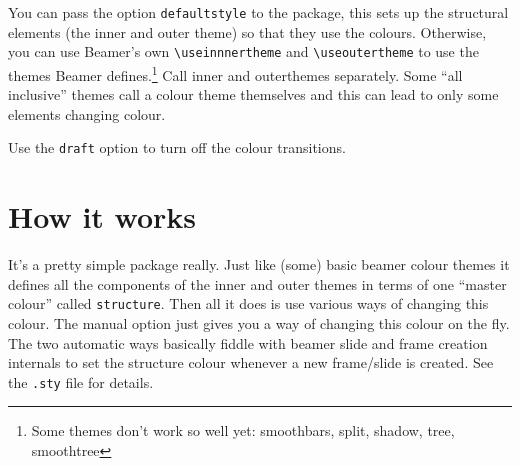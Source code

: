 \documentclass{scrartcl}
\begin{document}
You can pass the option \lstinline+defaultstyle+ to the package, this sets up the structural elements (the inner and outer theme) so that they use the colours.
Otherwise, you can use Beamer's own \lstinline+\useinnnertheme+ and \lstinline+\useoutertheme+ to use the themes Beamer defines.\footnote{%
  Some themes don't work so well yet: smoothbars, split, shadow, tree, smoothtree}
Call inner and outerthemes separately.
Some ``all inclusive'' themes call a colour theme themselves and this can lead to only some elements changing colour.

Use the \lstinline+draft+ option to turn off the colour transitions.

\section{How it works}

It's a pretty simple package really.
Just like (some) basic beamer colour themes it defines all the components of the inner and outer themes 
  in terms of one ``master colour'' called \lstinline+structure+.
Then all it does is use various ways of changing this colour.
The manual option just gives you a way of changing this colour on the fly.
The two automatic ways basically fiddle with beamer slide and frame creation internals to set the structure colour whenever a new frame/slide is created.
See the \lstinline+.sty+ file for details.
\end{document}
